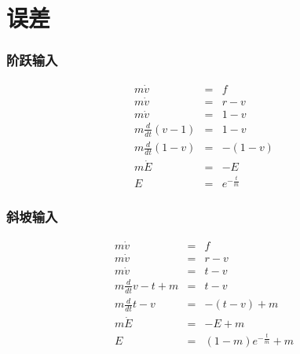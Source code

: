 \documentclass{beamer}
\begin{document}
\section{误差}
\label{sec-5}
\begin{frame}
\frametitle{阶跃输入}
\label{sec-5-1}


\begin{eqnarray*}
 m \dot{v} & =& f\\
 m \dot{v} & =& r-v\\
 m \dot{v} & =& 1-v\\
 m \frac{d}{dt}(v-1) & =& 1-v\\
 m \frac{d}{dt}(1-v) & =& -(1-v)\\
m \dot{E} &=& -E \\
E &=& e^{-\frac{t}{m}}
\end{eqnarray*}
\end{frame}
\begin{frame}
\frametitle{斜坡输入}
\label{sec-5-2}


\begin{eqnarray*}
 m \dot{v} & =& f\\
 m \dot{v} & =& r-v\\
 m \dot{v} & =& t-v\\
 m \frac{d}{dt}{v-t} +m & =& t-v\\
 m \frac{d}{dt}{t-v} & =& -(t-v) +m\\
m \dot{E} &=& -E +m\\
E &=& (1-m)e^{-\frac{t}{m}}+m
\end{eqnarray*}
\end{frame}
\end{document}
